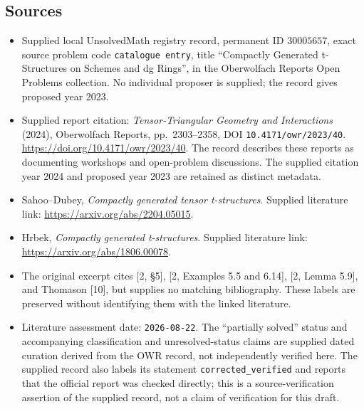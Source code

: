 \documentclass[11pt]{article}
\begin{document}
\subsection{Sources}
\begin{itemize}
\item Supplied local UnsolvedMath registry record, permanent ID \(30005657\), exact source problem code \texttt{catalogue entry}, title ``Compactly Generated t-Structures on Schemes and dg Rings'', in the Oberwolfach Reports Open Problems collection. No individual proposer is supplied; the record gives proposed year 2023.
\item Supplied report citation: \emph{Tensor-Triangular Geometry and Interactions} (2024), Oberwolfach Reports, pp.\ 2303--2358, DOI \texttt{10.4171/owr/2023/40}. \url{https://doi.org/10.4171/owr/2023/40}. The record describes these reports as documenting workshops and open-problem discussions. The supplied citation year 2024 and proposed year 2023 are retained as distinct metadata.
\item Sahoo--Dubey, \emph{Compactly generated tensor t-structures}. Supplied literature link: \url{https://arxiv.org/abs/2204.05015}.
\item Hrbek, \emph{Compactly generated t-structures}. Supplied literature link: \url{https://arxiv.org/abs/1806.00078}.
\item The original excerpt cites [2, \S5], [2, Examples 5.5 and 6.14], [2, Lemma 5.9], and Thomason [10], but supplies no matching bibliography. These labels are preserved without identifying them with the linked literature.
\item Literature assessment date: \texttt{2026-08-22}. The ``partially solved'' status and accompanying classification and unresolved-status claims are supplied dated curation derived from the OWR record, not independently verified here. The supplied record also labels its statement \texttt{corrected\_verified} and reports that the official report was checked directly; this is a source-verification assertion of the supplied record, not a claim of verification for this draft.
\end{itemize}
\end{document}
